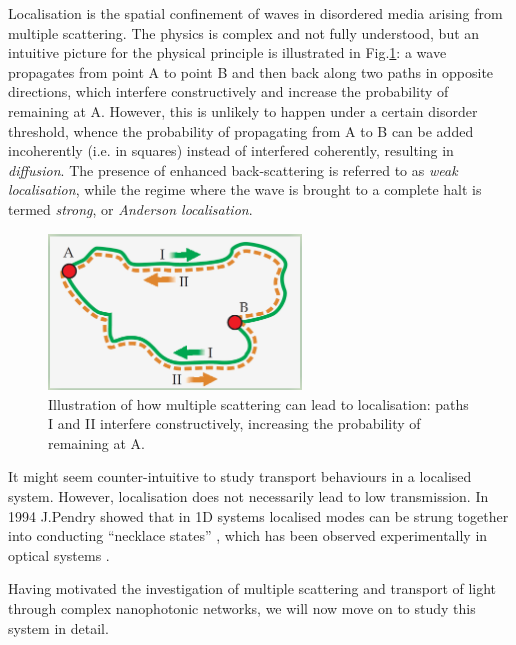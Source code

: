 Localisation is the spatial confinement of waves in disordered media arising from multiple scattering. The physics is complex and not fully understood, but an intuitive picture for the physical principle is illustrated in Fig.\ref{fig:multiple_scattering}: a wave propagates from point A to point B and then back along two paths in opposite directions, which interfere constructively and increase the probability of remaining at A. However, this is unlikely to happen under a certain disorder threshold, whence the probability of propagating from A to B can be added incoherently (i.e. in squares) instead of interfered coherently, resulting in \textit{diffusion}. The presence of enhanced back-scattering is referred to as \textit{weak localisation}, while the regime where the wave is brought to a complete halt is termed \textit{strong}, or \textit{Anderson localisation}. \cite{Lagendijk2009}

\begin{figure}[h]
  \centering
    \includegraphics[width=0.6\textwidth]{ch1/fig1/multiple_scattering}
    \caption{Illustration of how multiple scattering can lead to localisation: paths I and II interfere constructively, increasing the probability of remaining at A. \cite{Lagendijk2009}}
    \label{fig:multiple_scattering}
\end{figure}

It might seem counter-intuitive to study transport behaviours in a localised system. However, localisation does not necessarily lead to low transmission. In 1994 J.Pendry showed that in 1D systems localised modes can be strung together into conducting ``necklace states'' \cite{Pendry1994}, which has been observed experimentally in optical systems \cite{Bertolotti2005}.

Having motivated the investigation of multiple scattering and transport of light through complex nanophotonic networks, we will now move on to study this system in detail.




